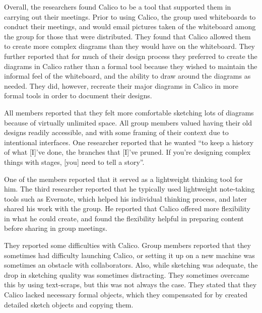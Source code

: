 Overall, the researchers found Calico to be a tool that supported them in carrying out their meetings. Prior to using Calico, the group used whiteboards to conduct their meetings, and would email pictures taken of the whiteboard among the group for those that were distributed. They found that Calico allowed them to create more complex diagrams than they would have on the whiteboard. They further reported that for much of their design process they preferred to create the diagrams in Calico rather than a formal tool because they wished to maintain the informal feel of the whiteboard, and the ability to draw around the diagrams as needed. They did, however, recreate their major diagrams in Calico in more formal tools in order to document their designs.

All members reported that they felt more comfortable sketching lots of diagrams because of virtually unlimited space. All group members valued having their old designs readily accessible, and with some framing of their context due to intentional interfaces. One researcher reported that he wanted ``to keep a history of what [I]'ve done, the branches that [I]'ve pruned. If you're designing complex things with stages, [you] need to tell a story''.

One of the members reported that it served as a lightweight thinking tool for him. The third researcher reported that he typically used lightweight note-taking tools such as Evernote, which helped his individual thinking process, and later shared his work with the group. He reported that Calico offered more flexibility in what he could create, and found the flexibility helpful in preparing content before sharing in group meetings.


They reported some difficulties with Calico. Group members reported that they sometimes had difficulty launching Calico, or setting it up on a new machine was sometimes an obstacle with collaborators. Also, while sketching was adequate, the drop in sketching quality was sometimes distracting. They sometimes overcame this by using text-scraps, but this was not always the case. They stated that they Calico lacked necessary formal objects, which they compensated for by created detailed sketch objects and copying them.


